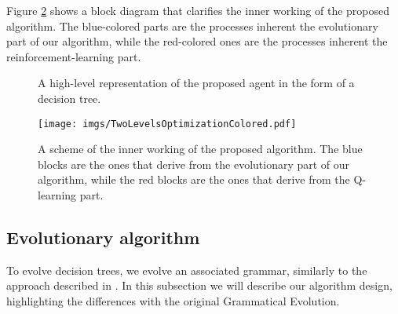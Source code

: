 \documentclass[review,english]{elsarticle}
\begin{document}
Figure \ref{fig:scheme} shows a block diagram that clarifies the inner working of the proposed algorithm.
The blue-colored parts are the processes inherent the evolutionary part of our algorithm, while the red-colored ones are the processes inherent the reinforcement-learning part.

\begin{figure}
    \centering
    \caption{A high-level representation of the proposed agent in the form of a decision tree.}
    \label{fig:tree_agent}
\end{figure}

\begin{figure}
    \centering
    \texttt{[image: imgs/TwoLevelsOptimizationColored.pdf]}
    \caption{A scheme of the inner working of the proposed algorithm. The blue blocks are the ones that derive from the evolutionary part of our algorithm, while the red blocks are the ones that derive from the Q-learning part.}
    \label{fig:scheme}
\end{figure}
\subsection{Evolutionary algorithm}
To evolve decision trees, we evolve an associated grammar, similarly to the approach described in \cite{goos_grammatical_1998}.
In this subsection we will describe our algorithm design, highlighting the differences with the original Grammatical Evolution.
\end{document}
